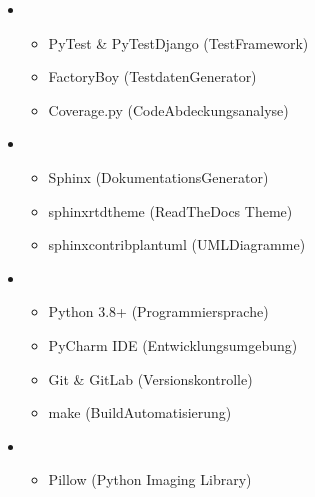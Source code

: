 \documentclass[a4paper,12pt,ngerman]{sphinxmanual}
\begin{document}
\begin{itemize}
\begin{itemize}
\item {} 
\sphinxAtStartPar
systemd (Service\sphinxhyphen{}Management)

\end{itemize}

\item {} 
\sphinxAtStartPar
{}
\begin{itemize}
\item {} 
\sphinxAtStartPar
PyTest \& PyTest\sphinxhyphen{}Django (Test\sphinxhyphen{}Framework)

\item {} 
\sphinxAtStartPar
FactoryBoy (Testdaten\sphinxhyphen{}Generator)

\item {} 
\sphinxAtStartPar
Coverage.py (Code\sphinxhyphen{}Abdeckungsanalyse)

\end{itemize}

\item {} 
\sphinxAtStartPar
{}
\begin{itemize}
\item {} 
\sphinxAtStartPar
Sphinx (Dokumentations\sphinxhyphen{}Generator)

\item {} 
\sphinxAtStartPar
sphinx\sphinxhyphen{}rtd\sphinxhyphen{}theme (ReadTheDocs Theme)

\item {} 
\sphinxAtStartPar
sphinxcontrib\sphinxhyphen{}plantuml (UML\sphinxhyphen{}Diagramme)

\end{itemize}

\item {} 
\sphinxAtStartPar
{}
\begin{itemize}
\item {} 
\sphinxAtStartPar
Python 3.8+ (Programmiersprache)

\item {} 
\sphinxAtStartPar
PyCharm IDE (Entwicklungsumgebung)

\item {} 
\sphinxAtStartPar
Git \& GitLab (Versionskontrolle)

\item {} 
\sphinxAtStartPar
make (Build\sphinxhyphen{}Automatisierung)

\end{itemize}

\item {} 
\sphinxAtStartPar
{}
\begin{itemize}
\item {} 
\sphinxAtStartPar
Pillow (Python Imaging Library)

\end{itemize}

\end{itemize}
\end{document}
